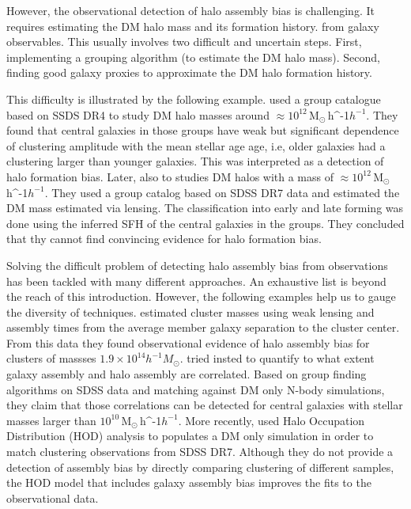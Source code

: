 \documentclass[fleqn,usenatbib]{mnras}
\newcommand{\Msunh}{\,{\rm M}$_{\odot}$\,\ifmmode h^{-1}\else $h^{-1}$\fi}
\begin{document}
However, the observational detection of halo assembly bias is challenging.
It requires estimating the DM halo mass and its formation history.
from galaxy observables.
This usually involves two difficult and uncertain steps.
First, implementing a grouping algorithm (to estimate the DM halo
mass). 
Second, finding good galaxy proxies to approximate the DM halo
formation history.   

This difficulty is illustrated by the following example.
\citet{Lacerna_2014} used a group catalogue based on SSDS DR4
to study DM halo masses around $\approx 10^{12}$\Msunh. 
They found that central galaxies in those groups have weak but
significant dependence of clustering amplitude with the mean stellar
age age, i.e, older galaxies had a clustering larger than younger
galaxies. This was interpreted as a detection of halo formation bias.
Later, \citet{2016ApJ...819..119L} also to studies DM halos with a
mass of $\approx 10^{12}$\Msunh. 
They used a group catalog based on SDSS DR7 data  and estimated the DM
mass estimated via lensing.
The classification into early and late forming was done using  the
inferred SFH of the central galaxies in the groups.  
They concluded that thy cannot find convincing evidence for halo
formation bias.  

Solving the difficult problem of detecting halo assembly bias from observations has been tackled with many different approaches.
An exhaustive list is beyond the reach of this introduction.
However, the following examples  help us to gauge the diversity of techniques.
\citet{2016PhRvL.116d1301M} estimated cluster masses using weak lensing and
assembly times from the average member galaxy separation to the cluster center. 
From this data they found observational evidence of halo assembly bias
for clusters of massses $1.9\times 10^{14}h^{-1}M_\odot$.
\citet{2018MNRAS.478.4487T} tried insted to quantify to what extent
galaxy assembly and halo assembly are correlated.
Based on group finding algorithms on SDSS data and matching against DM only N-body simulations,
they claim that those correlations can be detected for central
galaxies with stellar masses larger than $10^{10}$\Msunh.
More recently, \citet{2019MNRAS.485.1196Z} used Halo Occupation
Distribution (HOD) analysis to populates a DM only simulation in order
to match clustering observations from SDSS DR7. 
Although they do not provide a detection of assembly bias by directly
comparing clustering of different samples, 
the HOD model that includes galaxy assembly bias improves the fits to
the observational data. 
\end{document}

